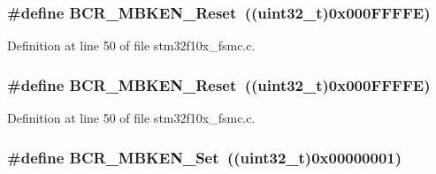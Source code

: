 \subsubsection[{\texorpdfstring{B\+C\+R\+\_\+\+M\+B\+K\+E\+N\+\_\+\+Reset}{BCR_MBKEN_Reset}}]{\setlength{\rightskip}{0pt plus 5cm}\#define B\+C\+R\+\_\+\+M\+B\+K\+E\+N\+\_\+\+Reset~(({\bf uint32\+\_\+t})0x000\+F\+F\+F\+F\+E)}\hypertarget{group___f_s_m_c___private___defines_gaa63b72d32a32c53a057ee0a45bed0d3b}{}\label{group___f_s_m_c___private___defines_gaa63b72d32a32c53a057ee0a45bed0d3b}


Definition at line 50 of file stm32f10x\+\_\+fsmc.\+c.

\subsubsection[{\texorpdfstring{B\+C\+R\+\_\+\+M\+B\+K\+E\+N\+\_\+\+Reset}{BCR_MBKEN_Reset}}]{\setlength{\rightskip}{0pt plus 5cm}\#define B\+C\+R\+\_\+\+M\+B\+K\+E\+N\+\_\+\+Reset~(({\bf uint32\+\_\+t})0x000\+F\+F\+F\+F\+E)}\hypertarget{group___f_s_m_c___private___defines_gaa63b72d32a32c53a057ee0a45bed0d3b}{}\label{group___f_s_m_c___private___defines_gaa63b72d32a32c53a057ee0a45bed0d3b}


Definition at line 50 of file stm32f10x\+\_\+fsmc.\+c.

\subsubsection[{\texorpdfstring{B\+C\+R\+\_\+\+M\+B\+K\+E\+N\+\_\+\+Set}{BCR_MBKEN_Set}}]{\setlength{\rightskip}{0pt plus 5cm}\#define B\+C\+R\+\_\+\+M\+B\+K\+E\+N\+\_\+\+Set~(({\bf uint32\+\_\+t})0x00000001)}\hypertarget{group___f_s_m_c___private___defines_ga3c427afcf32b17fb72be67fd4638e6d5}{}\label{group___f_s_m_c___private___defines_ga3c427afcf32b17fb72be67fd4638e6d5}


